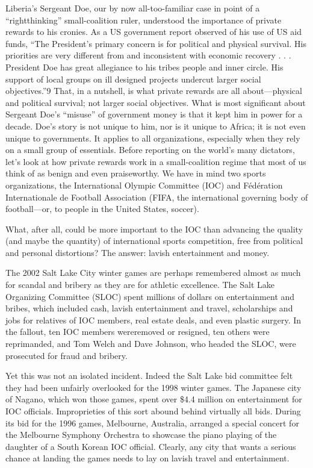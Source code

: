 \documentclass[10pt]{article}
\begin{document}
{\large Liberia's Sergeant Doe, our by now all-too-familiar case in point of a
``rightthinking'' small-coalition ruler, understood the importance of private
rewards to his cronies. As a US government report observed of his use of US aid
funds, ``The President's primary concern is for political and physical survival.
His priorities are very different from and inconsistent with economic recovery .
. . President Doe has great allegiance to his tribes people and inner circle. His
support of local groups on ill designed projects undercut larger social
objectives.''9 That, in a nutshell, is what private rewards are all
about---physical and political survival; not larger social objectives. What is
most significant about Sergeant Doe's ``misuse'' of government money is that it
kept him in power for a decade. Doe's story is not unique to him, nor is it
unique to Africa; it is not even unique to governments. It applies to all
organizations, especially when they rely on a small group of essentials. Before
reporting on the world's many dictators, let's look at how private rewards work
in a small-coalition regime that most of us think of as benign and even
praiseworthy. We have in mind two sports organizations, the International Olympic
Committee (IOC) and F\'{e}d\'{e}ration Internationale de Football Association
(FIFA, the international governing body of football---or, to people in the United
States, soccer).}

{\large What, after all, could be more important to the IOC than advancing the
quality (and maybe the quantity) of international sports competition, free from
political and personal distortions? The answer: lavish entertainment and money.}

{\large The 2002 Salt Lake City winter games are perhaps remembered almost as
much for scandal and bribery as they are for athletic excellence. The Salt Lake
Organizing Committee (SLOC) spent millions of dollars on entertainment and
bribes, which included cash, lavish entertainment and travel, scholarships and
jobs for relatives of IOC members, real estate deals, and even plastic surgery.
In the fallout, ten IOC members wereremoved or resigned, ten others were
reprimanded, and Tom Welch and Dave Johnson, who headed the SLOC, were prosecuted
for fraud and bribery.}

{\large Yet this was not an isolated incident. Indeed the Salt Lake bid
committee felt they had been unfairly overlooked for the 1998 winter games. The
Japanese city of Nagano, which won those games, spent over \$4.4 million on
entertainment for IOC officials. Improprieties of this sort abound behind
virtually all bids. During its bid for the 1996 games, Melbourne, Australia,
arranged a special concert for the Melbourne Symphony Orchestra to showcase the
piano playing of the daughter of a South Korean IOC official. Clearly, any city
that wants a serious chance at landing the games needs to lay on lavish travel
and entertainment.}
\end{document}
